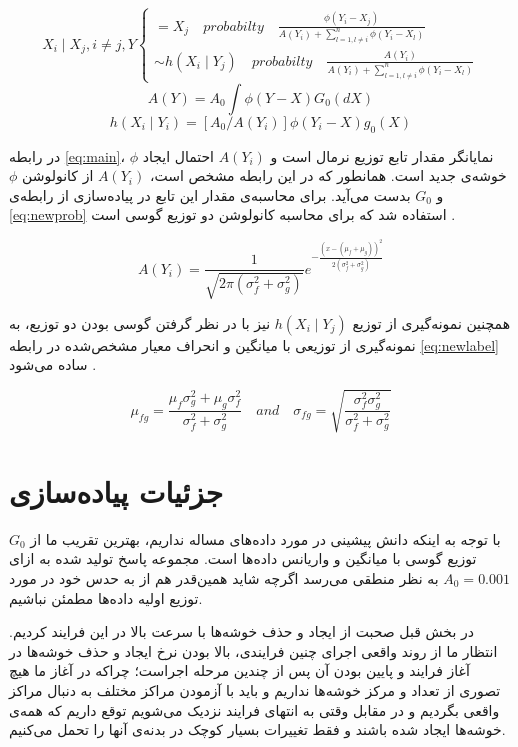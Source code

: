 \documentclass{article}
\begin{document}
\begin{equation} \label{eq:main}
{X}_{i} \mid {X}_{j}, i\neq j, Y 
\begin{cases} = {X}_{j} \quad probabilty \quad \frac{\phi ({Y}_{i}-{X}_{j})}{A({Y}_{i})+\sum _{l=1, l\neq i}^{n}{\phi ({Y}_{i}-{X}_{l})}} \\ \sim  h({X}_{i } \mid {Y}_{j}) \quad probabilty \quad \frac {A({Y}_{i})}{A({Y}_{i})+\sum _{l=1, l\neq i}^{n}{\phi ({Y}_{i}-{X}_{l})}}  \end{cases} 
\end{equation}
$$ A(Y) = {A}_{0} \int \phi(Y - X) {G}_{0}(dX) $$
$$ h(X_i \mid Y_i) = [A_0 / A(Y_i)] \phi(Y_i - X) g_0(X) $$

در رابطه \ref{eq:main}، $\phi$ نمایانگر مقدار تابع توزیع نرمال است و $A(Y_i)$ احتمال ایجاد خوشه‌ی جدید است. همانطور که در این رابطه مشخص است، $A(Y_i)$ از کانولوشن $\phi$ و $G_0$ بدست می‌آید. برای محاسبه‌ی مقدار این تابع در پیاده‌سازی از رابطه‌ی \ref{eq:newprob} استفاده شد که برای محاسبه کانولوشن دو توزیع گوسی است \cite{gaussian-distributions}.

\begin{equation} \label{eq:newprob}
A({Y}_{i})=\frac {1}{\sqrt {2\pi ({\sigma}_{f}^{2}+{\sigma}_{g}^{2})}} {e}^{ -\frac {{(x-({\mu}_{f}+{\mu}_{g}))}^{2}}{2({\sigma}_{f}^{2}+{\sigma}_{g}^{2})}}
\end{equation}

همچنین نمونه‌گیری از توزیع $h(X_i \mid Y_j)$ نیز با در نظر گرفتن گوسی بودن دو توزیع، به نمونه‌گیری از توزیعی با میانگین و انحراف معیار مشخص‌شده در رابطه \ref{eq:newlabel} ساده می‌شود \cite{gaussian-distributions}.

\begin{equation} \label{eq:newlabel}
{\mu}_{fg}=\frac {{\mu}_{f}{\sigma}_{g}^{2}+{\mu}_{g}{\sigma}_{f}^{2}}{{\sigma}_{f}^{2}+{\sigma}_{g}^{2}} \quad and\quad {\sigma}_{fg}=\sqrt {\frac {{\sigma}_{f}^{2}{\sigma}_{g}^{2}}{{\sigma}_{f}^{2}+{\sigma}_{g}^{2}}} 
\end{equation}

\section{جزئیات پیاده‌سازی}
با توجه به اینکه دانش پیشینی در مورد داده‌های مساله نداریم، بهترین تقریب ما از $G_0$ توزیع گوسی با میانگین و واریانس داده‌ها است. مجموعه پاسخ تولید شده به ازای $A_0 = 0.001$ به نظر منطقی می‌رسد اگرچه شاید همین‌قدر هم از به حدس خود در مورد توزیع اولیه داده‌ها مطمئن نباشیم.

در بخش قبل صحبت از ایجاد و حذف خوشه‌ها با سرعت بالا در این فرایند کردیم. انتظار ما از روند واقعی اجرای چنین فرایندی، بالا بودن نرخ ایجاد و حذف خوشه‌ها در آغاز فرایند و پایین بودن آن پس از چندین مرحله اجراست؛ چراکه در آغاز ما هیچ تصوری از تعداد و مرکز خوشه‌ها نداریم و باید با آزمودن مراکز مختلف به دنبال مراکز واقعی بگردیم و در مقابل وقتی به انتهای فرایند نزدیک می‌شویم توقع داریم که همه‌ی خوشه‌ها ایجاد شده باشند و فقط تغییرات بسیار کوچک در بدنه‌ی آنها را تحمل می‌کنیم.
\end{document}
